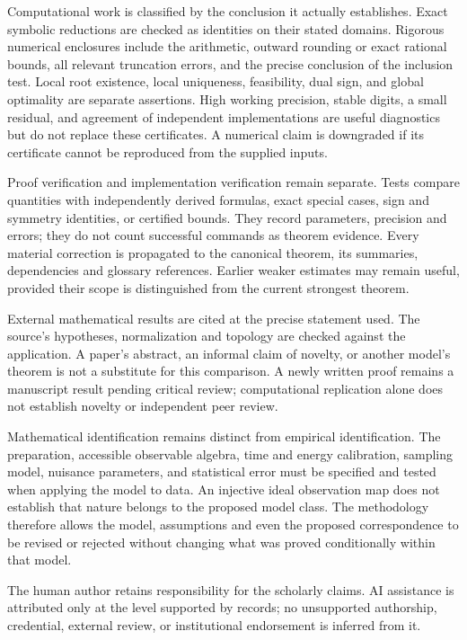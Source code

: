 \documentclass[
  10pt,
  a4paper,
]{article}
\begin{document}
Computational work is classified by the conclusion it actually establishes. Exact symbolic reductions are checked as identities on their stated domains. Rigorous numerical enclosures include the arithmetic, outward rounding or exact rational bounds, all relevant truncation errors, and the precise conclusion of the inclusion test. Local root existence, local uniqueness, feasibility, dual sign, and global optimality are separate assertions. High working precision, stable digits, a small residual, and agreement of independent implementations are useful diagnostics but do not replace these certificates. A numerical claim is downgraded if its certificate cannot be reproduced from the supplied inputs.

Proof verification and implementation verification remain separate. Tests compare quantities with independently derived formulas, exact special cases, sign and symmetry identities, or certified bounds. They record parameters, precision and errors; they do not count successful commands as theorem evidence. Every material correction is propagated to the canonical theorem, its summaries, dependencies and glossary references. Earlier weaker estimates may remain useful, provided their scope is distinguished from the current strongest theorem.

External mathematical results are cited at the precise statement used. The source's hypotheses, normalization and topology are checked against the application. A paper's abstract, an informal claim of novelty, or another model's theorem is not a substitute for this comparison. A newly written proof remains a manuscript result pending critical review; computational replication alone does not establish novelty or independent peer review.

Mathematical identification remains distinct from empirical identification. The preparation, accessible observable algebra, time and energy calibration, sampling model, nuisance parameters, and statistical error must be specified and tested when applying the model to data. An injective ideal observation map does not establish that nature belongs to the proposed model class. The methodology therefore allows the model, assumptions and even the proposed correspondence to be revised or rejected without changing what was proved conditionally within that model.

The human author retains responsibility for the scholarly claims. AI assistance is attributed only at the level supported by records; no unsupported authorship, credential, external review, or institutional endorsement is inferred from it.
\end{document}
